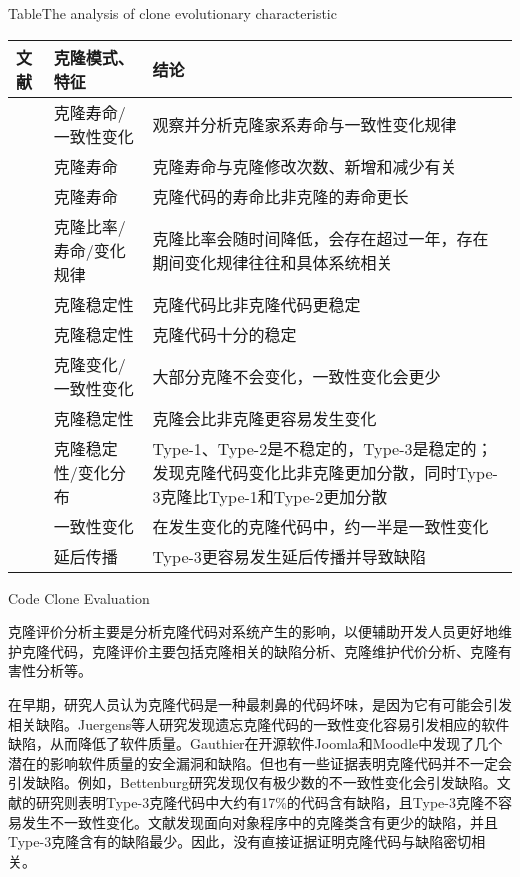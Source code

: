 \begin{table}[h]
\centering
{}
{Table$\!$}{The analysis of clone evolutionary characteristic}
\vspace{0.5em}
\wuhao
\begin{tabularx}{0.9\textwidth}{llX}
\toprule[1.5pt]
文献&克隆模式、特征&结论\\
\midrule[1pt]
\cite{kim2005empirical}&	克隆寿命/一致性变化	&观察并分析克隆家系寿命与一致性变化规律\\
\cite{cai2011empirical}&	克隆寿命&	克隆寿命与克隆修改次数、新增和减少有关\\
\cite{krinke2011cloned}&	克隆寿命&	克隆代码的寿命比非克隆的寿命更长\\
\cite{bazrafshan2012evolution}\cite{gode2009evolution}&	克隆比率/寿命/变化规律	&克隆比率会随时间降低，会存在超过一年，存在期间变化规律往往和具体系统相关\\
\hline
\cite{krinke2008cloned}&克隆稳定性&	克隆代码比非克隆代码更稳定\\
\cite{gode2011clone}\cite{harder2013cloned}&	克隆稳定性&	克隆代码十分的稳定\\
\cite{gode2011frequency}&	克隆变化/一致性变化&	大部分克隆不会变化，一致性变化会更少\\
\cite{rahman2014change}&	克隆稳定性&	克隆会比非克隆更容易发生变化\\
\cite{mondal2012comparative}\cite{mondal2012dispersion}&	克隆稳定性/变化分布&	Type-1、Type-2是不稳定的，Type-3是稳定的；发现克隆代码变化比非克隆更加分散，同时Type-3克隆比Type-1和Type-2更加分散\\
\hline
\cite{krinke2007study}&	一致性变化&	在发生变化的克隆代码中，约一半是一致性变化\\
\cite{barbour2011late}\cite{mondal2016comparative}&	延后传播&	Type-3更容易发生延后传播并导致缺陷\\
\bottomrule[1.5pt]
\end{tabularx}
\end{table}

{Code Clone Evaluation}

克隆评价分析主要是分析克隆代码对系统产生的影响，以便辅助开发人员更好地维护克隆代码，克隆评价主要包括克隆相关的缺陷分析、克隆维护代价分析、克隆有害性分析等。

在早期，研究人员认为克隆代码是一种最刺鼻的代码坏味，是因为它有可能会引发相关缺陷。Juergens等人研究发现遗忘克隆代码的一致性变化容易引发相应的软件缺陷，从而降低了软件质量\cite{juergens2009code,inoue2012experience}。Gauthier在开源软件Joomla和Moodle中发现了几个潜在的影响软件质量的安全漏洞和缺陷\cite{gauthier2013uncovering}。但也有一些证据表明克隆代码并不一定会引发缺陷。例如，Bettenburg研究发现仅有极少数的不一致性变化会引发缺陷\cite{bettenburg2009empirical}。文献\cite{wagner2016relationship}的研究则表明Type-3克隆代码中大约有17\%的代码含有缺陷，且Type-3克隆不容易发生不一致性变化。文献\cite{elish2015fault}发现面向对象程序中的克隆类含有更少的缺陷，并且Type-3克隆含有的缺陷最少。因此，没有直接证据证明克隆代码与缺陷密切相关\cite{lo2012active,kamei2011empirical}。

